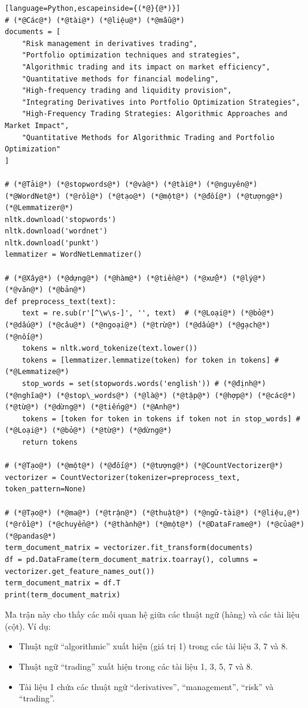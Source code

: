 \begin{lstlisting}[language=Python,escapeinside={(*@}{@*)}]
# (*@Các@*) (*@tài@*) (*@liệu@*) (*@mẫu@*)
documents = [
    "Risk management in derivatives trading",
    "Portfolio optimization techniques and strategies",
    "Algorithmic trading and its impact on market efficiency",
    "Quantitative methods for financial modeling",
    "High-frequency trading and liquidity provision",
    "Integrating Derivatives into Portfolio Optimization Strategies",
    "High-Frequency Trading Strategies: Algorithmic Approaches and Market Impact",
    "Quantitative Methods for Algorithmic Trading and Portfolio Optimization"
]

# (*@Tải@*) (*@stopwords@*) (*@và@*) (*@tài@*) (*@nguyên@*) (*@WordNet@*) (*@rồi@*) (*@tạo@*) (*@một@*) (*@đối@*) (*@tượng@*) (*@Lemmatizer@*)
nltk.download('stopwords')
nltk.download('wordnet')
nltk.download('punkt')
lemmatizer = WordNetLemmatizer()

# (*@Xây@*) (*@dựng@*) (*@hàm@*) (*@tiền@*) (*@xử@*) (*@lý@*) (*@văn@*) (*@bản@*)
def preprocess_text(text):
    text = re.sub(r'[^\w\s-]', '', text)  # (*@Loại@*) (*@bỏ@*) (*@dấu@*) (*@câu@*) (*@ngoại@*) (*@trừ@*) (*@dấu@*) (*@gạch@*) (*@nối@*)
    tokens = nltk.word_tokenize(text.lower())
    tokens = [lemmatizer.lemmatize(token) for token in tokens] # (*@Lemmatize@*)
    stop_words = set(stopwords.words('english')) # (*@định@*) (*@nghĩa@*) (*@stop\_words@*) (*@là@*) (*@tập@*) (*@hợp@*) (*@các@*) (*@từ@*) (*@dừng@*) (*@tiếng@*) (*@Anh@*)
    tokens = [token for token in tokens if token not in stop_words] # (*@Loại@*) (*@bỏ@*) (*@từ@*) (*@dừng@*)
    return tokens

# (*@Tạo@*) (*@một@*) (*@đối@*) (*@tượng@*) (*@CountVectorizer@*)
vectorizer = CountVectorizer(tokenizer=preprocess_text, token_pattern=None)

# (*@Tạo@*) (*@ma@*) (*@trận@*) (*@thuật@*) (*@ngữ-tài@*) (*@liệu,@*) (*@rồi@*) (*@chuyển@*) (*@thành@*) (*@một@*) (*@DataFrame@*) (*@của@*) (*@pandas@*)
term_document_matrix = vectorizer.fit_transform(documents)
df = pd.DataFrame(term_document_matrix.toarray(), columns = vectorizer.get_feature_names_out())
term_document_matrix = df.T
print(term_document_matrix)
\end{lstlisting}

Ma trận này cho thấy các mối quan hệ giữa các thuật ngữ (hàng) và các tài liệu (cột). Ví dụ:

\begin{itemize}
  \item Thuật ngữ ``algorithmic'' xuất hiện (giá trị 1) trong các tài liệu 3, 7 và 8.
  \item Thuật ngữ ``trading'' xuất hiện trong các tài liệu 1, 3, 5, 7 và 8.
  \item Tài liệu 1 chứa các thuật ngữ ``derivatives'', ``management'', ``risk'' và ``trading''.
\end{itemize}

